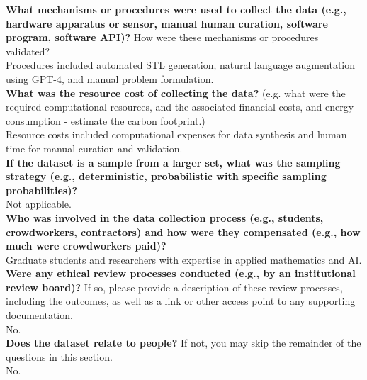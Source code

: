     \textcolor{\sectioncolor}{\textbf{What mechanisms or procedures were used to collect the data (e.g., hardware
    apparatus or sensor, manual human curation, software program, software
    API)?
    }
    How were these mechanisms or procedures validated?
    } \\
    Procedures included automated STL generation, natural language augmentation using GPT-4, and manual problem formulation. \\
    
    \textcolor{\sectioncolor}{\textbf{What was the resource cost of collecting the data?
    }
    (e.g. what were the required computational resources, and the associated
    financial costs, and energy consumption - estimate the carbon footprint.)} \\
    Resource costs included computational expenses for data synthesis and human time for manual curation and validation.
    \\
    
    \textcolor{\sectioncolor}{\textbf{If the dataset is a sample from a larger set, what was the sampling
    strategy (e.g., deterministic, probabilistic with specific sampling
    probabilities)?
    }
    } \\
    Not applicable. \\
    
    \textcolor{\sectioncolor}{\textbf{Who was involved in the data collection process (e.g., students,
    crowdworkers, contractors) and how were they compensated (e.g., how much
    were crowdworkers paid)?
    }
    } \\
    Graduate students and researchers with expertise in applied mathematics and AI. \\
    
    \textcolor{\sectioncolor}{\textbf{Were any ethical review processes conducted (e.g., by an institutional
    review board)?
    }
    If so, please provide a description of these review processes, including
    the outcomes, as well as a link or other access point to any supporting
    documentation.
    } \\
    No. \\
    
    \textcolor{\sectioncolor}{\textbf{Does the dataset relate to people?
    }
    If not, you may skip the remainder of the questions in this section.
    } \\
    No. \\
    
